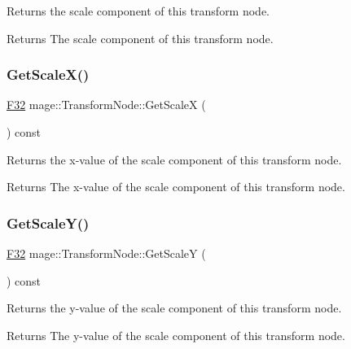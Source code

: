 Returns the scale component of this transform node.

\begin{DoxyReturn}{Returns}
The scale component of this transform node. 
\end{DoxyReturn}
\hypertarget{structmage_1_1_transform_node_a7c3e1b4a002bff02c7c5b9d10346a006}{}\label{structmage_1_1_transform_node_a7c3e1b4a002bff02c7c5b9d10346a006} 
\subsubsection{\texorpdfstring{Get\+Scale\+X()}{GetScaleX()}}
{\footnotesize\ttfamily \hyperlink{namespacemage_aa97e833b45f06d60a0a9c4fc22ae02c0}{F32} mage\+::\+Transform\+Node\+::\+Get\+ScaleX (\begin{DoxyParamCaption}{ }\end{DoxyParamCaption}) const\hspace{0.3cm}{\ttfamily [noexcept]}}

Returns the x-\/value of the scale component of this transform node.

\begin{DoxyReturn}{Returns}
The x-\/value of the scale component of this transform node. 
\end{DoxyReturn}
\hypertarget{structmage_1_1_transform_node_a30c5a1f0d549f3d082a04336831c2314}{}\label{structmage_1_1_transform_node_a30c5a1f0d549f3d082a04336831c2314} 
\subsubsection{\texorpdfstring{Get\+Scale\+Y()}{GetScaleY()}}
{\footnotesize\ttfamily \hyperlink{namespacemage_aa97e833b45f06d60a0a9c4fc22ae02c0}{F32} mage\+::\+Transform\+Node\+::\+Get\+ScaleY (\begin{DoxyParamCaption}{ }\end{DoxyParamCaption}) const\hspace{0.3cm}{\ttfamily [noexcept]}}

Returns the y-\/value of the scale component of this transform node.

\begin{DoxyReturn}{Returns}
The y-\/value of the scale component of this transform node. 
\end{DoxyReturn}
\hypertarget{structmage_1_1_transform_node_adcfc199469861d9af4cd8d532645ac99}{}\label{structmage_1_1_transform_node_adcfc199469861d9af4cd8d532645ac99} 
